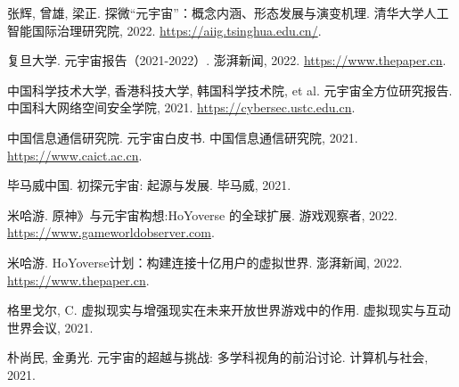 \documentclass[UTF8]{ctexart}
\begin{document}
	\begin{thebibliography}{9}
		
		 张辉, 曾雄, 梁正. 探微“元宇宙”：概念内涵、形态发展与演变机理. 清华大学人工智能国际治理研究院, 2022. \href{https://aiig.tsinghua.edu.cn/}{https://aiig.tsinghua.edu.cn/}.
		
		 复旦大学. 元宇宙报告（2021-2022）. 澎湃新闻, 2022. \href{https://www.thepaper.cn/newsDetail_forward_20050329}{https://www.thepaper.cn}.
		
		 中国科学技术大学, 香港科技大学, 韩国科学技术院, et al. 元宇宙全方位研究报告. 中国科大网络空间安全学院, 2021. \href{https://cybersec.ustc.edu.cn}{https://cybersec.ustc.edu.cn}.
		
		 中国信息通信研究院. 元宇宙白皮书. 中国信息通信研究院, 2021. \href{https://www.caict.ac.cn}{https://www.caict.ac.cn}.
		
		 毕马威中国. 初探元宇宙: 起源与发展. 毕马威, 2021.
		
	 米哈游. 原神》与元宇宙构想:HoYoverse 的全球扩展. 游戏观察者, 2022. \href{https://www.gameworldobserver.com}{https://www.gameworldobserver.com}.
	
	 米哈游. HoYoverse计划：构建连接十亿用户的虚拟世界. 澎湃新闻, 2022. \href{https://www.thepaper.cn/newsDetail_forward_20050329}{https://www.thepaper.cn}.
	
	 格里戈尔, C. 虚拟现实与增强现实在未来开放世界游戏中的作用. 虚拟现实与互动世界会议, 2021.
	
	 朴尚民, 金勇光. 元宇宙的超越与挑战: 多学科视角的前沿讨论. 计算机与社会, 2021.
	
\end{thebibliography}
	
	
\end{document}
